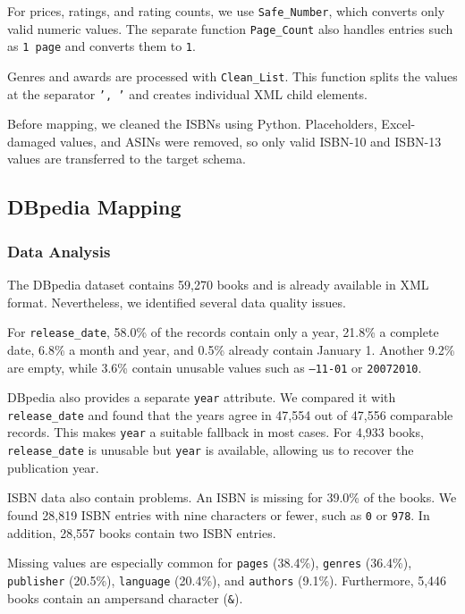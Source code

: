 \documentclass[runningheads]{llncs}
\begin{document}
For prices, ratings, and rating counts, we use
\texttt{Safe\_Number}, which converts only valid numeric
values. The separate function \texttt{Page\_Count}
also handles entries such as \texttt{1 page} and converts
them to \texttt{1}.

Genres and awards are processed with \texttt{Clean\_List}.
This function splits the values at the separator
\texttt{', '} and creates individual XML child elements.

Before mapping, we cleaned the ISBNs using Python.
Placeholders, Excel-damaged values, and ASINs were removed,
so only valid ISBN-10 and ISBN-13 values are transferred
to the target schema.


\subsection{DBpedia Mapping}

\subsubsection{Data Analysis}

The DBpedia dataset contains 59,270 books and is already
available in XML format. Nevertheless, we identified
several data quality issues.

For \texttt{release\_date}, 58.0\% of the records contain
only a year, 21.8\% a complete date, 6.8\% a month and year,
and 0.5\% already contain January 1. Another 9.2\% are
empty, while 3.6\% contain unusable values such as
\texttt{--11-01} or \texttt{20072010}.

DBpedia also provides a separate \texttt{year} attribute.
We compared it with \texttt{release\_date} and found that
the years agree in 47,554 out of 47,556 comparable records.
This makes \texttt{year} a suitable fallback in most cases.
For 4,933 books, \texttt{release\_date} is unusable but
\texttt{year} is available, allowing us to recover the
publication year.

ISBN data also contain problems. An ISBN is missing for
39.0\% of the books. We found 28,819 ISBN entries with
nine characters or fewer, such as \texttt{0} or
\texttt{978}. In addition, 28,557 books contain two
ISBN entries.

Missing values are especially common for \texttt{pages}
(38.4\%), \texttt{genres} (36.4\%), \texttt{publisher}
(20.5\%), \texttt{language} (20.4\%), and \texttt{authors}
(9.1\%). Furthermore, 5,446 books contain an ampersand
character (\texttt{\&}).
\end{document}
